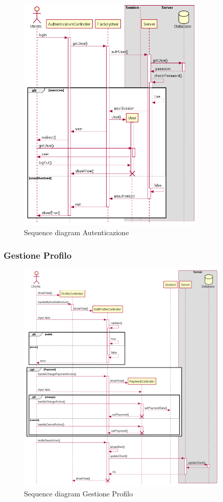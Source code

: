 \documentclass[12pt, a4paper]{report}
\begin{document}
\begin{figure}[h]
  \centering
  \includegraphics[width=0.8\textwidth]{auth_sequence.png}
  \caption{Sequence diagram Autenticazione}
\end{figure}

\newpage

\subsubsection{Gestione Profilo}

\begin{figure}[h]
  \centering
  \includegraphics[width=0.9\textwidth]{profile_sequence.png}
  \caption{Sequence diagram Gestione Profilo}
\end{figure}
\end{document}
